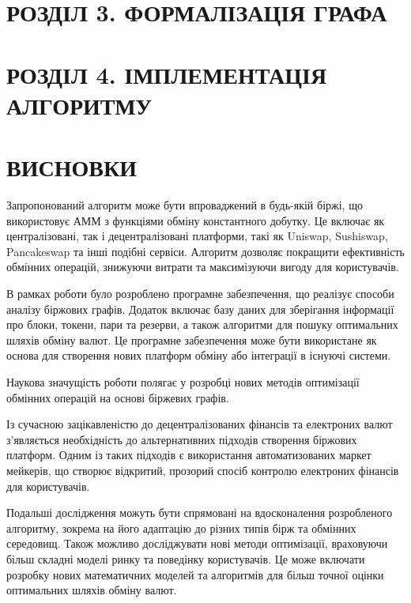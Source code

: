\documentclass[14pt]{extarticle}
\begin{document}
\section*{РОЗДІЛ 3. ФОРМАЛІЗАЦІЯ ГРАФА}\label{sec:graph}
\setcounter{section}{3}

\newpage

\section*{РОЗДІЛ 4. ІМПЛЕМЕНТАЦІЯ АЛГОРИТМУ}\label{sec:algorithm-impl}
\setcounter{section}{4}

\newpage

\section*{ВИСНОВКИ}\label{sec:conclusions}

Запропонований алгоритм може бути впроваджений в будь-якій біржі, що
використовує АММ з функціями обміну константного добутку. Це включає як
централізовані, так і децентралізовані платформи, такі як Uniswap, Sushiswap,
Pancakeswap та інші подібні сервіси. Алгоритм дозволяє покращити ефективність
обмінних операцій, знижуючи витрати та максимізуючи вигоду для користувачів.

В рамках роботи було розроблено програмне забезпечення, що реалізує способи
аналізу біржових графів. Додаток включає базу даних для зберігання інформації про
блоки, токени, пари та резерви, а також алгоритми для пошуку оптимальних шляхів
обміну валют. Це програмне забезпечення може бути використане як основа для
створення нових платформ обміну або інтеграції в існуючі системи.

Наукова значущість роботи полягає у розробці нових методів оптимізації обмінних
операцій на основі біржевих графів.

Із сучасною зацікавленістю до децентралізованих фінансів та електроних валют
з'являється необхідність до альтернативних підходів створення біржових платформ.
Одним із таких підходів є використання автоматизованих маркет мейкерів, що
створює відкритий, прозорий спосіб контролю електроних фінансів для
користувачів.

Подальші дослідження можуть бути спрямовані на вдосконалення розробленого
алгоритму, зокрема на його адаптацію до різних типів бірж та обмінних середовищ.
Також можливо досліджувати нові методи оптимізації, враховуючи більш складні
моделі ринку та поведінку користувачів. Це може включати розробку нових
математичних моделей та алгоритмів для більш точної оцінки оптимальних шляхів
обміну валют.
\end{document}

